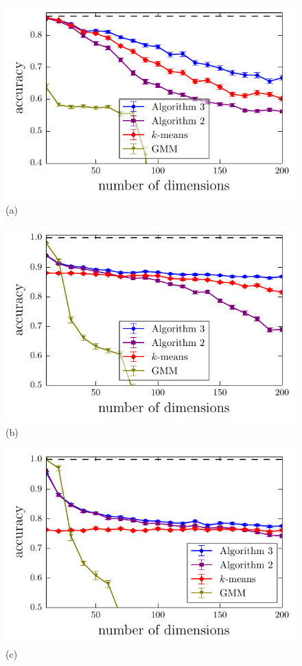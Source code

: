 \documentclass[aps,preprint,nofootinbib,floatfix]{revtex4-1}
\begin{document}
\begin{figure}
\begin{minipage}{0.49\textwidth}
\includegraphics[width=1\textwidth]{gauss_dim.pdf}\\[-1.0em] (a)
\end{minipage}
\begin{minipage}{0.49\textwidth}
\includegraphics[width=1\textwidth]{gauss_cov_squareroot.pdf}\\[-1.0em] (b)
\end{minipage}
\begin{minipage}{0.49\textwidth}
\includegraphics[width=1\textwidth]{gauss_cov_linear.pdf}\\[-1.0em] (c)

\end{minipage}
\end{figure}
\end{document}
